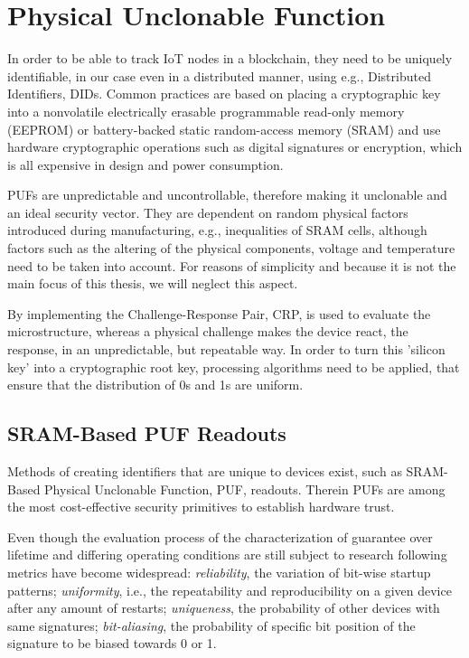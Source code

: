 \section{Physical Unclonable Function} %
\label{sec:Physical Unclonable Function}

In order to be able to track IoT nodes in a blockchain, they need to be uniquely identifiable, in our case even in a
distributed manner, using e.g., Distributed Identifiers, DIDs.
Common practices are based on placing a cryptographic key into a nonvolatile electrically erasable programmable
read-only memory (EEPROM) or battery-backed static random-access memory (SRAM) and use hardware cryptographic operations
such as digital signatures or encryption, which is all expensive in design and power consumption. \cite{herder2014physical}

PUFs are unpredictable and uncontrollable, therefore making it unclonable and an ideal security vector. They are
dependent on random physical factors introduced during manufacturing, e.g., inequalities of SRAM cells, although factors
such as the altering of the physical components, voltage and temperature need to be taken into account. \cite{vinagrero2023sram}
For reasons of simplicity and because it is not the main focus of this thesis, we will neglect this aspect.

By implementing the Challenge-Response Pair, CRP, is used to evaluate the microstructure, whereas a physical challenge
makes the device react, the response, in an unpredictable, but repeatable way.
In order to turn this 'silicon key' into a cryptographic root key, processing algorithms need to be applied, that ensure
that the distribution of 0s and 1s are uniform. \cite{herder2014physical}

\subsection{SRAM-Based PUF Readouts} %
\label{sec:SRAM-Based PUF Readouts}

Methods of creating identifiers that are unique to devices exist, such as SRAM-Based Physical Unclonable Function, PUF,
readouts. Therein PUFs are among the most cost-effective security primitives to establish hardware trust.
\cite{holcomb2007initial}

Even though the evaluation process of the characterization of guarantee over lifetime and differing operating conditions
are still subject to research following metrics have become widespread: \textit{reliability}, the variation of bit-wise
startup patterns; \textit{uniformity}, i.e., the repeatability and reproducibility on a given device after any amount of
restarts; \textit{uniqueness}, the probability of other devices with same signatures; \textit{bit-aliasing}, the
probability of specific bit position of the signature to be biased towards 0 or 1. \cite{vinagrero2023sram}

